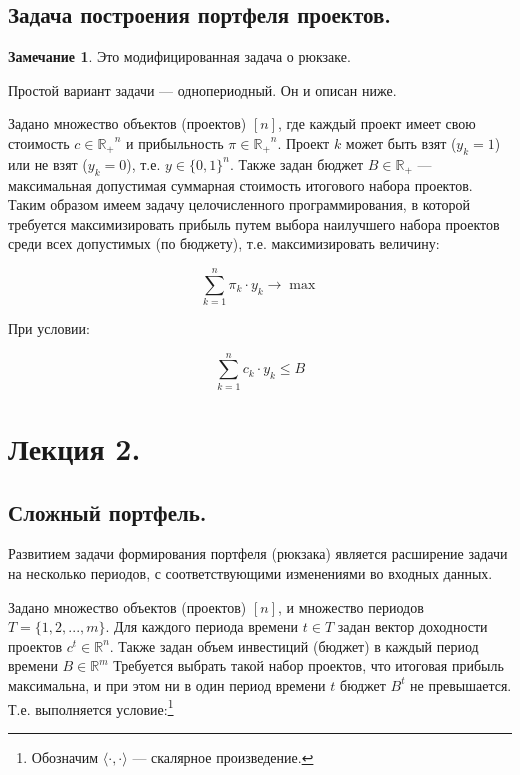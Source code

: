 \documentclass[reqno]{article}
\theoremstyle{definition}
\newtheorem*{nb}{Замечание}
\theoremstyle{definition}
\theoremstyle{definition}
\theoremstyle{definition}
\theoremstyle{definition}
\theoremstyle{definition}
\theoremstyle{definition}
\theoremstyle{definition}
\theoremstyle{definition}
\begin{document}
		\subsection{Задача построения портфеля проектов.}

			\begin{nb}
				Это модифицированная задача о рюкзаке.
			\end{nb}
			
			Простой вариант задачи --- однопериодный. Он и описан ниже.
			
			Задано множество объектов (проектов) $[n]$, где каждый проект имеет свою стоимость $c \in \mathds{R_+}^n$ и прибыльность $\pi \in \mathds{R_+}^n$. Проект $k$ может быть взят ($y_k = 1$) или не взят ($y_k = 0$), т.е. $y \in \{0, 1\}^n$. Также задан бюджет $B \in \mathds{R_+}$ --- максимальная допустимая суммарная стоимость итогового набора проектов. Таким образом имеем задачу целочисленного программирования, в которой требуется максимизировать прибыль путем выбора наилучшего набора проектов среди всех допустимых (по бюджету), т.е. максимизировать величину:
			
			$$\sum^n_{k=1} \pi_k \cdot y_k \rightarrow \max$$

			При условии:
			
			$$\sum^n_{k=1} c_k \cdot y_k \leq B$$


	\newpage
	\section{Лекция 2.}
		\subsection{Сложный портфель.}
		
			Развитием задачи формирования портфеля (рюкзака) является расширение задачи на несколько периодов, с соответствующими изменениями во входных данных.

			Задано множество объектов (проектов) $[n]$, и множество периодов $T = \{1, 2, ..., m\}$. Для каждого периода времени $t \in T$ задан вектор доходности проектов $c^t \in \mathds{R}^n$. Также задан объем инвестиций (бюджет) в каждый период времени $B \in \mathds{R}^m$ Требуется выбрать такой набор проектов, что итоговая прибыль максимальна, и при этом ни в один период времени $t$ бюджет $B^t$ не превышается. Т.е. выполняется условие:\footnote{Обозначим $\langle \cdot, \cdot \rangle$ --- скалярное произведение.}
			
\end{document}
